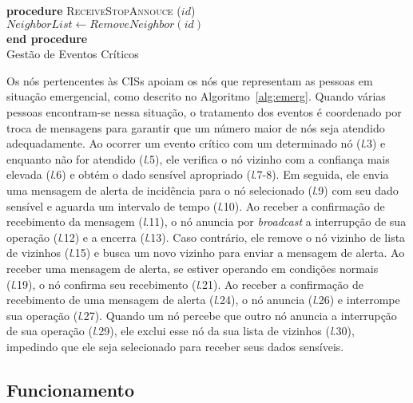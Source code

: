 \documentclass[12pt]{article}
\newcommand{\sep}{\hspace{8 mm}}
\begin{document}
\begin{algorithm}[H]
{{\vspace{-0.01cm}

\sep \textbf{procedure} \textsc{ReceiveStopAnnouce} ($id$) \\
\sep \sep $NeighborList \leftarrow RemoveNeighbor(id)$\\
\sep \textbf{end procedure} \\
\caption{Gestão de Eventos Críticos}
\label{alg:emerg}
}}
\end{algorithm}


Os nós pertencentes às
CISs
apoiam os nós que representam as pessoas em situação emergencial, como 
descrito no Algoritmo~\ref{alg:emerg}. Quando várias pessoas encontram-se nessa situação, o tratamento dos eventos é coordenado por troca de mensagens para garantir que um número maior de nós seja atendido adequadamente. Ao ocorrer um evento crítico com um determinado nó (\textit{l}.3) e enquanto
não for atendido
(\textit{l}.5), ele verifica o nó vizinho com a confiança mais elevada (\textit{l}.6) e obtém o dado sensível apropriado (\textit{l}.7-8). Em seguida, ele envia uma mensagem de alerta de incidência para o nó selecionado (\textit{l}.9) com seu dado sensível e aguarda um intervalo de tempo (\textit{l}.10). Ao receber a confirmação de recebimento da mensagem (\textit{l}.11), o nó anuncia por \textit{broadcast} a interrupção de sua operação (\textit{l}.12) e a encerra (\textit{l}.13). Caso contrário, ele remove o nó vizinho de lista de vizinhos (\textit{l}.15) e busca um novo vizinho para enviar a mensagem de alerta. Ao receber uma mensagem de alerta, se estiver operando em condições normais (\textit{l}.19), o nó confirma seu recebimento (\textit{l}.21). Ao receber a confirmação de recebimento de uma mensagem de alerta (\textit{l}.24), o nó anuncia (\textit{l}.26) e interrompe sua operação (\textit{l}.27). Quando um nó percebe que outro nó anuncia a interrupção de sua operação (\textit{l}.29), ele exclui esse nó da sua lista de vizinhos (\textit{l}.30), impedindo que ele seja selecionado para receber seus dados sensíveis.

\subsection{Funcionamento}
\end{document}
